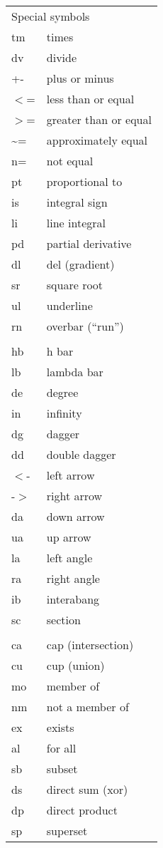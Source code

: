 \begin{tabular}{ll}
\multicolumn{2}{l}{Special symbols} \\
tm & times \\
dv & divide \\
+- & plus or minus \\
$<$= & less than or equal \\
$>$= & greater than or equal \\
\~{}= & approximately equal \\
n= & not equal \\
pt & proportional to \\
is & integral sign \\
li & line integral \\
pd & partial derivative \\
dl & del (gradient) \\
sr & square root \\
ul & underline \\
rn & overbar (``run'') \\
 \\
hb & h bar \\
lb & lambda bar \\
de & degree \\
in & infinity \\
dg & dagger \\
dd & double dagger \\
$<$- & left arrow \\
-$>$ & right arrow \\
da & down arrow \\
ua & up arrow \\
la & left angle \\
ra & right angle \\
ib & interabang \\
sc & section \\
 \\
ca & cap (intersection) \\
cu & cup (union) \\
mo & member of \\
nm & not a member of \\
ex & exists \\
al & for all \\
sb & subset \\
ds & direct sum (xor) \\
dp & direct product \\
sp & superset
\end{tabular}

